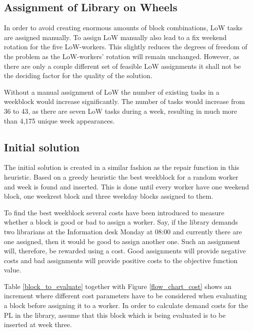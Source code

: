 \subsection{Assignment of Library on Wheels} \label{LoW_assignment}
In order to avoid creating enormous amounts of block combinations, LoW tasks are assigned manually. To assign LoW manually also lead to a fix weekend rotation for the five LoW-workers. This slightly reduces the degrees of freedom of the problem as the LoW-workers' rotation will remain unchanged. However, as there are only a couple different set of feasible LoW assignments it shall not be the deciding factor for the quality of the solution.

Without a manual assignment of LoW the number of existing tasks in a weekblock would increase significantly. The number of tasks would increase from 36 to 43, as there are seven LoW tasks during a week, resulting in much more than 4,175 unique week appearances. %

\subsection{Initial solution} \label{initial_solution}
The initial solution is created in a similar fashion as the repair function in this heuristic. Based on a greedy heuristic the best weekblock for a random worker and week is found and inserted. This is done until every worker have one weekend block, one weekrest block and three weekday blocks assigned to them.

To find the best weekblock several costs have been introduced to measure whether a block is good or bad to assign a worker. Say, if the library demands two librarians at the Information desk Monday at 08:00 and currently there are one assigned, then it would be good to assign another one. Such an assignment will, therefore, be rewarded using a cost. Good assignments will provide negative costs and bad assignments will provide positive costs to the objective function value.

Table \ref{block_to_evaluate} together with Figure \ref{flow_chart_cost} shows an increment where different cost parameters have to be considered when evaluating a block before assigning it to a worker. In order to calculate demand costs for the PL in the library, assume that this block which is being evaluated is to be inserted at week three.

